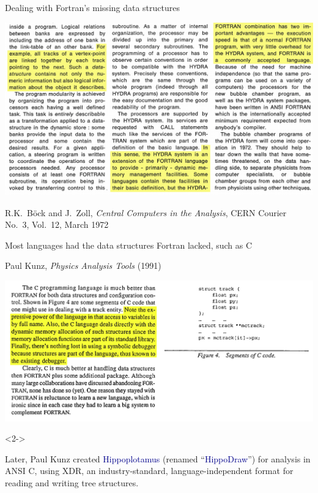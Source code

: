 \documentclass[aspectratio=169]{beamer}
\begin{document}
\begin{frame}{Dealing with Fortran's missing data structures}
\scriptsize
\vspace{0.25 cm}
\begin{center}
\includegraphics[width=0.85\linewidth]{PLOTS/hydra-1.png}

R.K.\ B\"ock and J.\ Zoll, {\it Central Computers in the Analysis}, CERN Courier No.\ 3, Vol.\ 12, March 1972
\end{center}
\end{frame}

\begin{frame}{Most languages had the data structures Fortran lacked, such as C}
\vspace{0.5 cm}
\begin{center}
\begin{minipage}{0.8\linewidth}
\begin{center}
Paul Kunz, {\it Physics Analysis Tools} (1991)
\end{center}
\end{minipage}

\vspace{0.25 cm}
\includegraphics[width=0.9\linewidth]{PLOTS/kunz-physics-analysis-tools.png}
\end{center}

\begin{uncoverenv}<2->
\vspace{-2.25 cm}
\hfill\begin{minipage}{0.48\linewidth}
Later, Paul Kunz created \textcolor{darkblue}{Hippoplotamus} (renamed ``\textcolor{darkblue}{HippoDraw}'') for analysis in ANSI C, using XDR, an industry-standard, language-independent format for reading and writing tree structures.
\end{minipage}\hspace{-0.25 cm}
\vspace{1.5 cm}
\end{uncoverenv}
\end{frame}
\end{document}
